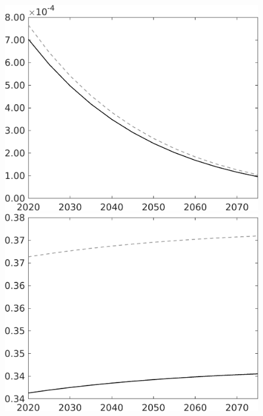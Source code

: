 \documentclass[12pt]{article}
\begin{document}
\begin{figure}[h!!]
\begin{minipage}[]{0.32\textwidth}
	\end{minipage}	
	\begin{minipage}[]{0.32\textwidth}
		\includegraphics[width=1\textwidth]{../../codding_model/own_basedOnFried/optimalPol_010922_revision/figures/all_13Sept22/CompTaul_LFBAU_Reg0_Lg_spillover0_nsk1_xgr1_knspil1_sep1_countec0_GovRev0_etaa0.79_lgd0.png}
	\end{minipage}	
	\begin{minipage}[]{0.32\textwidth}
		\includegraphics[width=1\textwidth]{../../codding_model/own_basedOnFried/optimalPol_010922_revision/figures/all_13Sept22/CompTaul_LFBAU_Reg0_Ln_spillover0_nsk1_xgr1_knspil1_sep1_countec0_GovRev0_etaa0.79_lgd0.png}

\end{minipage}
\end{figure}
\end{document}
